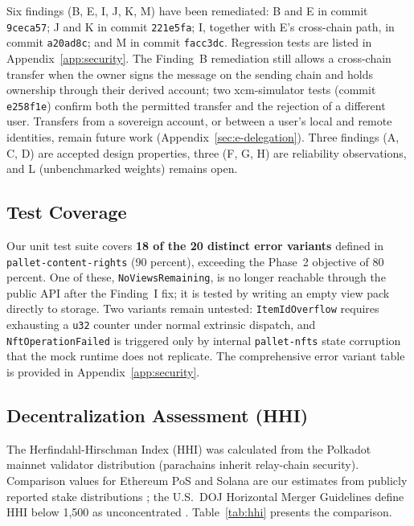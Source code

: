 Six findings (B, E, I, J, K, M) have been remediated: B and E in commit \texttt{9ceca57}; J and K in commit \texttt{221e5fa}; I, together with E's cross-chain path, in commit \texttt{a20ad8c}; and M in commit \texttt{facc3dc}. Regression tests are listed in Appendix~\ref{app:security}. The Finding~B remediation still allows a cross-chain transfer when the owner signs the message on the sending chain and holds ownership through their derived account; two xcm-simulator tests (commit \texttt{e258f1e}) confirm both the permitted transfer and the rejection of a different user. Transfers from a sovereign account, or between a user's local and remote identities, remain future work (Appendix~\ref{sec:e-delegation}). Three findings (A, C, D) are accepted design properties, three (F, G, H) are reliability observations, and L (unbenchmarked weights) remains open.

\subsection{Test Coverage}\label{subsec:test-coverage}

Our unit test suite covers \textbf{18 of the 20 distinct error variants} defined in \texttt{pallet-\allowbreak content-\allowbreak rights} (90 percent), exceeding the Phase~2 objective of 80 percent. One of these, \texttt{NoViewsRemaining}, is no longer reachable through the public API after the Finding~I fix; it is tested by writing an empty view pack directly to storage. Two variants remain untested: \texttt{ItemIdOverflow} requires exhausting a \texttt{u32} counter under normal extrinsic dispatch, and \texttt{NftOperationFailed} is triggered only by internal \texttt{pallet-nfts} state corruption that the mock runtime does not replicate. The comprehensive error variant table is provided in Appendix~\ref{app:security}.

\subsection{Decentralization Assessment (HHI)}\label{subsec:decentralization-hhi}

The Herfindahl-Hirschman Index (HHI) was calculated from the Polkadot mainnet validator distribution (parachains inherit relay-chain security). Comparison values for Ethereum PoS and Solana are our estimates from publicly reported stake distributions \citep{ratedNetwork2026, solanaCompass2026}; the U.S.\ DOJ Horizontal Merger Guidelines define HHI below 1,500 as unconcentrated \citep{dojFTC2010}. Table~\ref{tab:hhi} presents the comparison.

